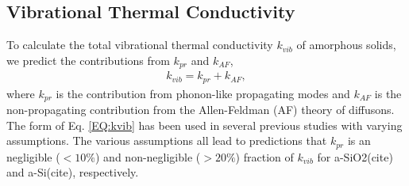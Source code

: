 \documentclass[aps,prb,onecolumn,preprint,superscriptaddress,footinbib,amsmath,amssymb,floatfix]{revtex4}
\begin{document}
\subsection{\label{S:Theory:Thermal}Vibrational Thermal Conductivity}

To calculate the total vibrational thermal conductivity $k_{vib}$ 
of amorphous solids, we predict 
the contributions from $k_{pr}$ and $k_{AF}$, 
\begin{equation}\label{EQ:kvib}
\begin{split}
k_{vib} = k_{pr} + k_{AF},
\end{split}
\end{equation}
where $k_{pr}$\cite{ashcroft_solid_1976,dove_introduction_1993,
ziman_electrons_2001} is the contribution from phonon-like 
propagating modes and $k_{AF}$ is the non-propagating contribution 
from the Allen-Feldman (AF) theory of diffusons.
\cite{feldman_thermal_1993} The form of Eq. \eqref{EQ:kvib}
has been used in 
several previous studies with varying assumptions. The various 
assumptions all lead to predictions that $k_{pr}$ is an negligible 
($< 10\%$) 
and non-negligible ($> 20\%$) fraction of $k_{vib}$ 
for a-SiO2(cite) and a-Si(cite), respectively.  
\end{document}
